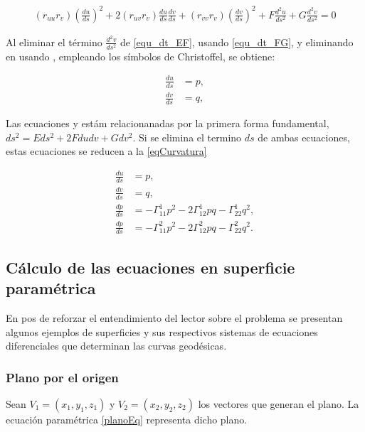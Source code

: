 \documentclass{endm}
\begin{document}
\begin{align} 
(r_{uu} r_v) (\frac{du}{ds})^2 + 2 (r_{uv} r_v) \frac{du}{ds} \frac{dv}{ds} + (r_{vv} r_v) (\frac{dv}{ds})^2 + F \frac{d^2u}{ds^2} + G \frac{d^2v}{ds^2} = 0
\label{equ_dt_FG}
\end{align}

Al eliminar el t\'ermino $\frac{d^2v}{ds^2}$ de \ref{equ_dt_EF}, usando \ref{equ_dt_FG}, y eliminando en \label{equ_dt_FG} usando \label{equ_dt_EF}, empleando los s\'imbolos de Christoffel, se obtiene:

\begin{align} 
\frac{du}{ds}&=p, \label{equ1_Geo}\\
\frac{dv}{ds}&=q, \label{equ2_Geo}
\end{align}

Las ecuaciones \label{equ1_Geo} y \label{equ2_Geo} est\'am relacionanadas por la primera forma fundamental, $ds^2 = E ds^2+ 2 Fdudv+ G dv^2$. Si se elimina el termino $ds$ de ambas ecuaciones, estas ecuaciones se reducen a la \ref{eqCurvatura}


\begin{align} 
\frac{du}{ds}&=p, \label{eq1Geodesica}\\
\frac{dv}{ds}&=q, \label{eq2Geodesica}    \\
\frac{dp}{ds}&= - \Gamma_{11}^1 p^2 -2 \Gamma_{12}^1 pq - \Gamma_{22}^1 q^2, \label{eq3Geodesica}\\ 
\frac{dp}{ds}&=- \Gamma_{11}^2 p^2 -2 \Gamma_{12}^2 pq - \Gamma_{22}^2 q^2. \label{eq4Geodesica}
\end{align}

\subsection{C\'alculo de las ecuaciones en superficie param\'etrica}
En pos de reforzar el entendimiento del lector sobre el problema se presentan algunos ejemplos de superficies y sus respectivos sistemas de ecuaciones diferenciales que determinan las curvas geod\'esicas.

\subsubsection{Plano por el origen}
Sean $V_1=(x_1,y_1,z_1)$ y $V_2=(x_2,y_2,z_2)$ los vectores que generan el plano.
La ecuaci\'on param\'etrica \ref{planoEq} representa dicho plano.
\end{document}
